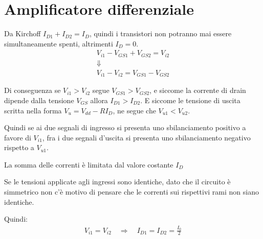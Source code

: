 \documentclass[../template]{subfiles}
\begin{document}
\section{Amplificatore differenziale}
\begin{center}
\end{center}
\label{circuito:amplificatore_differenziale}


Da Kirchoff $I_{D1} + I_{D2} = I_D$, quindi i transistori non potranno mai essere simultaneamente spenti, altrimenti $I_D = 0$.
\begin{gather*}
    V_{i1} - V_{GS1} + V_{GS2} = V_{i2}\\
    \Downarrow\\
    V_{i1} - V_{i2} =  V_{GS1} - V_{GS2}
\end{gather*}

Di conseguenza se $V_{i1} > V_{i2}$ segue $V_{GS1} > V_{GS2}$, e siccome la corrente di drain dipende dalla tensione $V_{GS}$
allora $I_{D1} > I_{D2}$.
E siccome le tensione di uscita scritta nella forma $V_u = V_{dd} - R I_D$, ne segue che $V_{u1} < V_{u2}$.

Quindi se ai due segnali di ingresso si presenta uno sbilanciamento positivo a favore di $V_{i1}$, fra i due segnali d'uscita
si presenta uno sbilanciamento negativo rispetto a $V_{u1}$.

La somma delle correnti è limitata dal valore costante $I_D$

Se le tensioni applicate agli ingressi sono identiche, dato che il circuito è simmetrico non c'è motivo di pensare che
le correnti sui rispettivi rami non siano identiche.

Quindi:
\begin{align*}
    V_{i1} = V_{i2} \quad \Rightarrow \quad I_{D1} = I_{D2} = \frac{I_0}{2}
\end{align*}
\end{document}
